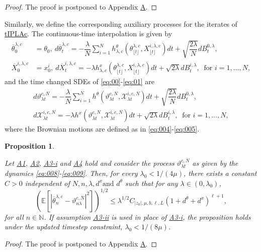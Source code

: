 \documentclass[a4paper, 10pt]{article}
\theoremstyle{plain}%
\newtheorem{proposition}{Proposition}%
\begin{document}
\begin{proof}
    The proof is postponed to Appendix \hyperref[Proof5]{A}.
\end{proof}
\noindent Similarly, we define the corresponding auxiliary processes for the iterates of \hyperref[algo2]{tIPLAc}. The continuous-time interpolation is given by
\begin{align}
\overline{\theta}_0^{\lambda,c}&=\theta_0,\ d\overline{\theta}_t^{\lambda,c}=-\dfrac{\lambda}{N}\sum_{i=1}^N h^{\theta}_{\lambda,c}(\theta_{\lfloor{t}\rfloor}^{\lambda,c},X^{i,\lambda,c}_{\lfloor{t}\rfloor})dt+\sqrt{\dfrac{{2\lambda}}{N}}dB_t^{0,\lambda},\label{eq:006}\\
\overline{X}_0^{i,\lambda,c}&=x^i_0,\ d\overline{X}_t^{i,\lambda,c}=-\lambda h^{x}_{\lambda,c}(\theta_{\lfloor{t}\rfloor}^{\lambda,c},X^{i,\lambda,c}_{\lfloor{t}\rfloor})dt+\sqrt{2\lambda }dB_t^{i,\lambda},\ \text{ for } i=1,\ldots,N,\label{eq:007}
\end{align}
and the time changed SDEs of \eqref{eq:00}-\eqref{eq:01} are
\begin{gather}
d{\vartheta}_{\lambda t}^{c,N}=-\dfrac{\lambda}{N}\sum_{i=1}^N h^{\theta}({\vartheta}^{c,N}_{\lambda t},\mathcal{X}_{\lambda t}^{i,c,N})dt+\sqrt{\dfrac{2\lambda }{N}}dB_t^{0,\lambda},\label{eq:008}\\
d\mathcal{X}_{\lambda t}^{i,c,N}=-{\lambda} h^{x}({\vartheta}^{c,N}_{\lambda t},\mathcal{X}_{\lambda t}^{i,c,N})dt+\sqrt{2\lambda}dB_t^{i,\lambda},\ \text{ for } i=1,\ldots,N,\label{eq:009}
\end{gather}where the Brownian motions are defined as in \eqref{eq:004}-\eqref{eq:005}.\\ 
\par \noindent \begin{proposition}\hypertarget{Prop6}{}\label{Proposition6} Let \hyperlink{Assum1}{A1}, \hyperlink{Assum2}{A2}, \hyperlink{Assum3a}{A3-i} and \hyperlink{Assum4}{A4} hold and consider the process ${\vartheta}_{\lambda t}^{c,N}$ as given by the dynamics \eqref{eq:008}-\eqref{eq:009}. Then, for every $\lambda_0<1/(4\mu)$, there exists a constant $C>0$ independent of $N,n,\lambda, d^x \text{and } d^{\theta}$ such that for any $\lambda\in(0,\lambda_0)$,
$$\left(\mathbb{E}\left[|\overline{\theta}^{\lambda,c}_n-\vartheta^{c,N}_{n\lambda}|^2\right]\right)^{1/2}\leq \lambda^{1/2} C_{|z_0|,\mu,b,\ell,L}{(1+d^{\theta}+d^x)}^{\ell+1},$$
for all $n\in\mathbb{N}$. If assumption \hyperlink{Assum3b}{A3-ii} is used in place of \hyperlink{Assum3a}{A3-i}, the proposition holds under the updated timestep constraint, $\lambda_0<1/(8\mu)$.\end{proposition}
\begin{proof}
    The proof is postponed to Appendix \hyperref[Proof6]{A}.
\end{proof}
\end{document}

